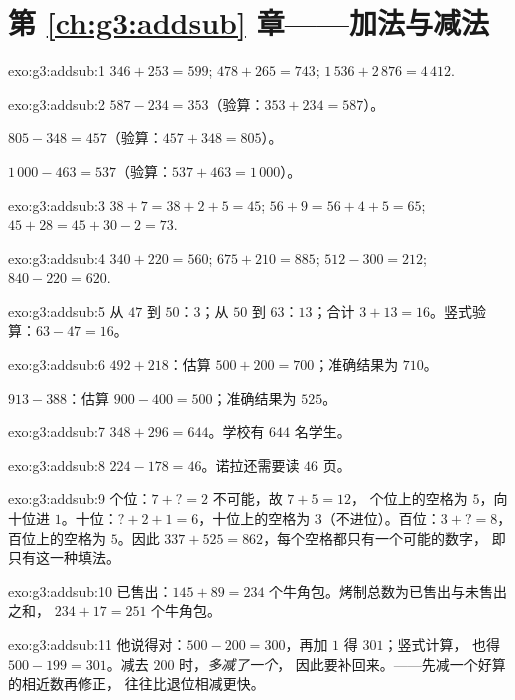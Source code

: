 \section*{第 \ref{ch:g3:addsub} 章——加法与减法}

\begin{solution}{exo:g3:addsub:1}
$346 + 253 = 599$; \quad
$478 + 265 = 743$; \quad
$1\,536 + 2\,876 = 4\,412$.
\end{solution}

\begin{solution}{exo:g3:addsub:2}
$587 - 234 = 353$（验算：$353 + 234 = 587$）。

$805 - 348 = 457$（验算：$457 + 348 = 805$）。

$1\,000 - 463 = 537$（验算：$537 + 463 = 1\,000$）。
\end{solution}

\begin{solution}{exo:g3:addsub:3}
$38 + 7 = 38 + 2 + 5 = 45$; \quad
$56 + 9 = 56 + 4 + 5 = 65$; \quad
$45 + 28 = 45 + 30 - 2 = 73$.
\end{solution}

\begin{solution}{exo:g3:addsub:4}
$340 + 220 = 560$; \quad $675 + 210 = 885$; \quad
$512 - 300 = 212$; \quad $840 - 220 = 620$.
\end{solution}

\begin{solution}{exo:g3:addsub:5}
从 $47$ 到 $50$：$3$；从 $50$ 到 $63$：$13$；合计
$3 + 13 = 16$。竖式验算：$63 - 47 = 16$。
\end{solution}

\begin{solution}{exo:g3:addsub:6}
$492 + 218$：估算 $500 + 200 = 700$；准确结果为 $710$。

$913 - 388$：估算 $900 - 400 = 500$；准确结果为 $525$。
\end{solution}

\begin{solution}{exo:g3:addsub:7}
$348 + 296 = 644$。学校有 $644$ 名学生。
\end{solution}

\begin{solution}{exo:g3:addsub:8}
$224 - 178 = 46$。诺拉还需要读 $46$ 页。
\end{solution}

\begin{solution}{exo:g3:addsub:9}
个位：$7 + \text{?} = 2$ 不可能，故 $7 + 5 = 12$，
个位上的空格为 $5$，向十位进 $1$。十位：$\text{?} + 2 + 1 = 6$，十位上的空格为
$3$（不进位）。百位：$3 + \text{?} = 8$，百位上的空格为
$5$。因此 $337 + 525 = 862$，每个空格都只有一个可能的数字，
即只有这一种填法。
\end{solution}

\begin{solution}{exo:g3:addsub:10}
已售出：$145 + 89 = 234$ 个牛角包。烤制总数为已售出与未售出之和，
$234 + 17 = 251$ 个牛角包。
\end{solution}

\begin{solution}{exo:g3:addsub:11}
他说得对：$500 - 200 = 300$，再加 $1$ 得 $301$；竖式计算，
也得 $500 - 199 = 301$。减去 $200$ 时，\emph{多减了一个}，
因此要补回来。——先减一个好算的相近数再修正，
往往比退位相减更快。
\end{solution}
